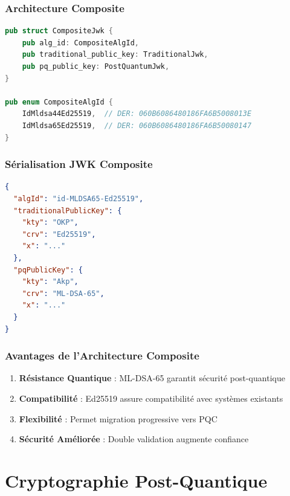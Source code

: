 \documentclass[12pt,a4paper]{report}
\begin{document}
\subsection{Architecture Composite}

\begin{lstlisting}[language=Rust]
pub struct CompositeJwk {
    pub alg_id: CompositeAlgId,
    pub traditional_public_key: TraditionalJwk,
    pub pq_public_key: PostQuantumJwk,
}

pub enum CompositeAlgId {
    IdMldsa44Ed25519,  // DER: 060B6086480186FA6B5008013E
    IdMldsa65Ed25519,  // DER: 060B6086480186FA6B50080147
}
\end{lstlisting}

\subsection{Sérialisation JWK Composite}

\begin{lstlisting}[language=json]
{
  "algId": "id-MLDSA65-Ed25519",
  "traditionalPublicKey": {
    "kty": "OKP",
    "crv": "Ed25519",
    "x": "..."
  },
  "pqPublicKey": {
    "kty": "Akp",
    "crv": "ML-DSA-65",
    "x": "..."
  }
}
\end{lstlisting}

\subsection{Avantages de l'Architecture Composite}

\begin{enumerate}
  \item \textbf{Résistance Quantique} : ML-DSA-65 garantit sécurité post-quantique
  \item \textbf{Compatibilité} : Ed25519 assure compatibilité avec systèmes existants
  \item \textbf{Flexibilité} : Permet migration progressive vers PQC
  \item \textbf{Sécurité Améliorée} : Double validation augmente confiance
\end{enumerate}

\chapter{Cryptographie Post-Quantique}
\end{document}
